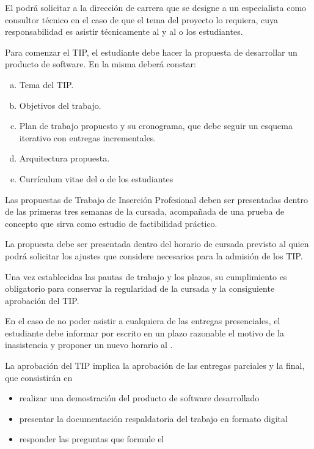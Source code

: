 \articulo El \profesorTIP{} podrá solicitar a la dirección de carrera que
se designe a un especialista como consultor técnico en el caso de que el tema
del proyecto lo requiera, cuya responsabilidad es asistir técnicamente al
\profesorTIP y al o los estudiantes.



\articulo Para comenzar el TIP, el estudiante debe hacer la propuesta de desarrollar un producto de
software. En la misma deberá constar:

\begin{enumerate}[a.]
\item Tema del TIP.
\item Objetivos del trabajo.
\item Plan de trabajo propuesto y su cronograma, que debe seguir un esquema iterativo con entregas
incrementales.
\item Arquitectura propuesta.
\item Currículum vitae del o de los estudiantes
\end{enumerate}

\articulo Las propuestas de Trabajo de Inserción Profesional deben ser presentadas
dentro de las primeras tres semanas de la cursada, acompañada de una prueba de concepto
que sirva como estudio de factibilidad práctico.

\articulo La propuesta debe ser presentada dentro del horario de cursada previsto al \profesorTIP{}
quien podrá solicitar los ajustes que considere necesarios para la admisión de los TIP. 


\articulo Una vez establecidas las pautas de trabajo y los plazos, 
su cumplimiento es obligatorio para conservar la regularidad de la cursada y la
consiguiente aprobación del TIP.

\articulo En el caso de no poder asistir a cualquiera de las entregas presenciales, el estudiante 
debe informar por escrito en un plazo razonable el motivo de la inasistencia y proponer un nuevo 
horario al \profesorTIP{}.


\articulo La aprobación del TIP implica la aprobación de las entregas parciales
y la final, que consistirán en 
\begin{itemize}
 \item realizar una demostración del producto de software desarrollado
 \item presentar la documentación respaldatoria del trabajo en formato digital
 \item responder las preguntas que formule el \profesorTIP{}
\end{itemize}

